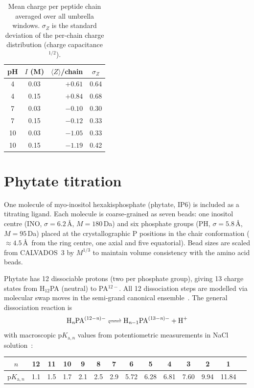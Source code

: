 \documentclass[11pt]{article}
\begin{document}
\begin{table}[h]
\centering
\begin{tabular}{@{}ccrc@{}}
\toprule
pH & $I$ (M) & $\langle Z \rangle$/chain & $\sigma_Z$ \\
\midrule
 4 & 0.03 & $+0.61$ & 0.64 \\
 4 & 0.15 & $+0.84$ & 0.68 \\
 7 & 0.03 & $-0.10$ & 0.30 \\
 7 & 0.15 & $-0.12$ & 0.33 \\
10 & 0.03 & $-1.05$ & 0.33 \\
10 & 0.15 & $-1.19$ & 0.42 \\
\bottomrule
\end{tabular}
\caption{Mean charge per peptide chain averaged over all umbrella windows.
  $\sigma_Z$ is the standard deviation of the per-chain charge distribution
  (charge capacitance$^{1/2}$).}
\end{table}

\section{Phytate titration}

One molecule of myo-inositol hexakisphosphate (phytate, IP6) is
included as a titrating ligand.  Each molecule is coarse-grained as
seven beads: one inositol centre (INO, $\sigma = 6.2$\,\AA,
$M = 180$\,Da) and six phosphate groups (PH, $\sigma = 5.8$\,\AA,
$M = 95$\,Da) placed at the crystallographic P positions in the
chair conformation ($\approx 4.5$\,\AA\ from the ring centre, one
axial and five equatorial).  Bead sizes are scaled from CALVADOS~3
by $M^{1/3}$ to maintain volume consistency with the amino acid beads.

Phytate has 12 dissociable protons (two per phosphate group),
giving 13 charge states from H$_{12}$PA (neutral) to PA$^{12-}$.
All 12 dissociation steps are modelled via molecular swap moves
in the semi-grand canonical ensemble~\cite{SmithTriska1994}.
The general dissociation reaction is
\[
\ce{H_{\textit{n}}PA^{(12-\textit{n})-} <=> H_{\textit{n}-1}PA^{(13-\textit{n})-} + H+}
\]
with macroscopic $\text{p}K_{\text{a},n}$ values from potentiometric
measurements in NaCl solution~\cite{DeStefano2003}:

\begin{table}[h]
\centering
\begin{tabular}{@{}cccccccccccccc@{}}
\toprule
$n$ & 12 & 11 & 10 & 9 & 8 & 7 & 6 & 5 & 4 & 3 & 2 & 1 \\
\midrule
$\text{p}K_{\text{a},n}$ & 1.1 & 1.5 & 1.7 & 2.1 & 2.5 & 2.9 & 5.72 & 6.28 & 6.81 & 7.60 & 9.94 & 11.84 \\
\bottomrule
\end{tabular}
\end{table}
\end{document}
